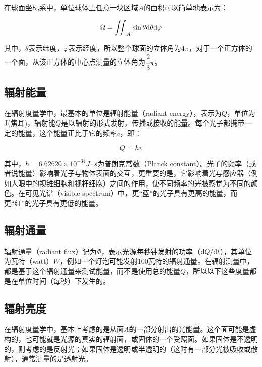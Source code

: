 在球面坐标系中，单位球体上任意一块区域$A$的面积可以简单地表示为：

\begin{equation}
	\Omega= {\rm \iint}_A \sin\theta {\rm d}\theta {\rm d}\varphi
\end{equation}

\noindent 其中，$\theta$表示纬度，$\varphi$表示经度，所以整个球面的立体角为$4\pi$，对于一个正方体的一个面，从该正方体的中心点测量的立体角为$ \cfrac{2}{3}\pi$。




\subsection{辐射能量}
在辐射度量学中，最基本的单位是辐射能量（radiant energy），表示为$Q$，单位为J(焦耳)，辐射能$Q$是以辐射的形式发射，传播或接收的能量。每个光子都携带一定的能量，这个能量正比于它的频率$v$，即：

\begin{equation}
	Q=hv
\end{equation}

\noindent 其中，$h=6.62620\times 10^{-34} J\cdot s$为普朗克常数（Planck constant）。光子的频率（或者说能量）影响着光子与物体表面的交互，更重要的是，它影响着光与感应器（例如人眼中的视锥细胞和视杆细胞）之间的作用，使不同频率的光被察觉为不同的颜色。在可见光谱（visible spectrum）中，更“蓝”的光子具有更高的能量，而更“红”的光子具有更低的能量。 




\subsection{辐射通量}
辐射通量（radiant flux）记为$\Phi$，表示光源每秒钟发射的功率（${\rm d}Q/{\rm d}t$），其单位为瓦特（watt）$W$，例如一个灯泡可能发射100瓦特的辐射通量。在辐射测量中，都是基于这个辐射通量来测试能量，而不是使用总的能量$Q$，所以以下这些度量都是在单位时间（每秒）下发生的。





\subsection{辐射亮度}
在辐射度量学中，基本上考虑的是从面$A$的一部分射出的光能量。这个面可能是虚构的，也可能就是光源的真实的辐射面，或固体的一个受照面。如果固体是不透明的，则考虑的是反射光；如果固体是透明或半透明的（这时有一部分光被吸收或散射），通常测量的是透射光。

